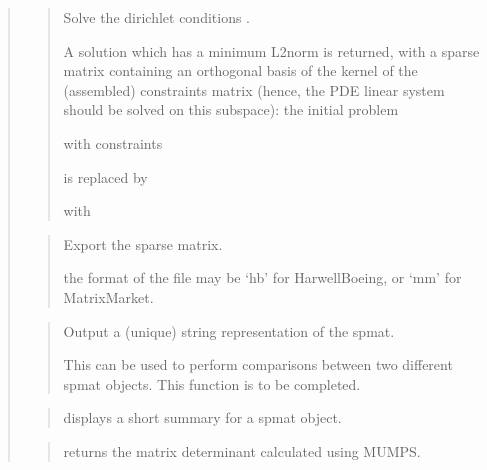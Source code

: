 \documentclass[a4paper,11pt,english]{sphinxmanual}
\begin{document}
\begin{quote}
\begin{quote}
\sphinxAtStartPar
Solve the dirichlet conditions .

\sphinxAtStartPar
A solution  which has a minimum L2\sphinxhyphen{}norm is returned, with a
sparse matrix  containing an orthogonal basis of the kernel of
the (assembled) constraints matrix  (hence, the PDE linear system
should be solved on this subspace): the initial problem

\sphinxAtStartPar
{} with constraints 

\sphinxAtStartPar
is replaced by

\sphinxAtStartPar
{} with 
\end{quote}

\sphinxAtStartPar
{}
\begin{quote}

\sphinxAtStartPar
Export the sparse matrix.

\sphinxAtStartPar
the format of the file may be ‘hb’ for Harwell\sphinxhyphen{}Boeing, or ‘mm’
for Matrix\sphinxhyphen{}Market.
\end{quote}

\sphinxAtStartPar
{}
\begin{quote}

\sphinxAtStartPar
Output a (unique) string representation of the spmat.

\sphinxAtStartPar
This can be used to perform comparisons between two
different spmat objects.
This function is to be completed.
\end{quote}

\sphinxAtStartPar
{}
\begin{quote}

\sphinxAtStartPar
displays a short summary for a spmat object.
\end{quote}

\sphinxAtStartPar
{}
\begin{quote}

\sphinxAtStartPar
returns the matrix determinant calculated using MUMPS.
\end{quote}
\end{quote}
\end{document}
